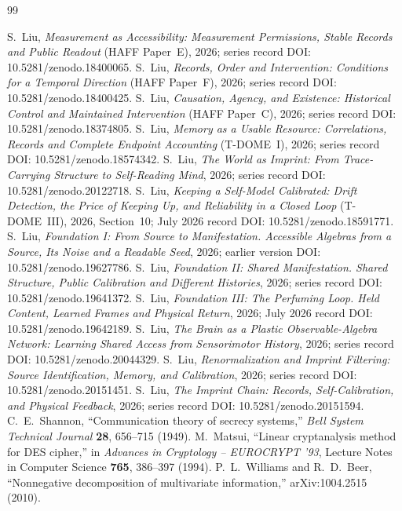 \documentclass[11pt,a4paper]{article}
\begin{document}
\begin{thebibliography}{99}
\raggedright
{} S.~Liu, \emph{Measurement as Accessibility: Measurement Permissions, Stable Records and Public Readout} (HAFF Paper~E), 2026; series record DOI: 10.5281/zenodo.18400065.
 S.~Liu, \emph{Records, Order and Intervention: Conditions for a Temporal Direction} (HAFF Paper~F), 2026; series record DOI: 10.5281/zenodo.18400425.
 S.~Liu, \emph{Causation, Agency, and Existence: Historical Control and Maintained Intervention} (HAFF Paper~C), 2026; series record DOI: 10.5281/zenodo.18374805.
 S.~Liu, \emph{Memory as a Usable Resource: Correlations, Records and Complete Endpoint Accounting} (T-DOME~I), 2026; series record DOI: 10.5281/zenodo.18574342.
 S.~Liu, \emph{The World as Imprint: From Trace-Carrying Structure to Self-Reading Mind}, 2026; series record DOI: 10.5281/zenodo.20122718.
 S.~Liu, \emph{Keeping a Self-Model Calibrated: Drift Detection, the Price of Keeping Up, and Reliability in a Closed Loop} (T-DOME~III), 2026, Section~10; July 2026 record DOI: 10.5281/zenodo.18591771.
 S.~Liu, \emph{Foundation I: From Source to Manifestation. Accessible Algebras from a Source, Its Noise and a Readable Seed}, 2026; earlier version DOI: 10.5281/zenodo.19627786.
 S.~Liu, \emph{Foundation II: Shared Manifestation. Shared Structure, Public Calibration and Different Histories}, 2026; series record DOI: 10.5281/zenodo.19641372.
 S.~Liu, \emph{Foundation III: The Perfuming Loop. Held Content, Learned Frames and Physical Return}, 2026; July 2026 record DOI: 10.5281/zenodo.19642189.
 S.~Liu, \emph{The Brain as a Plastic Observable-Algebra Network: Learning Shared Access from Sensorimotor History}, 2026; series record DOI: 10.5281/zenodo.20044329.
 S.~Liu, \emph{Renormalization and Imprint Filtering: Source Identification, Memory, and Calibration}, 2026; series record DOI: 10.5281/zenodo.20151451.
 S.~Liu, \emph{The Imprint Chain: Records, Self-Calibration, and Physical Feedback}, 2026; series record DOI: 10.5281/zenodo.20151594.
 C.~E.~Shannon, ``Communication theory of secrecy systems,'' \emph{Bell System Technical Journal} \textbf{28}, 656--715 (1949).
 M.~Matsui, ``Linear cryptanalysis method for DES cipher,'' in \emph{Advances in Cryptology -- EUROCRYPT '93}, Lecture Notes in Computer Science \textbf{765}, 386--397 (1994).
 P.~L.~Williams and R.~D.~Beer, ``Nonnegative decomposition of multivariate information,'' arXiv:1004.2515 (2010).

\end{thebibliography}
\end{document}
